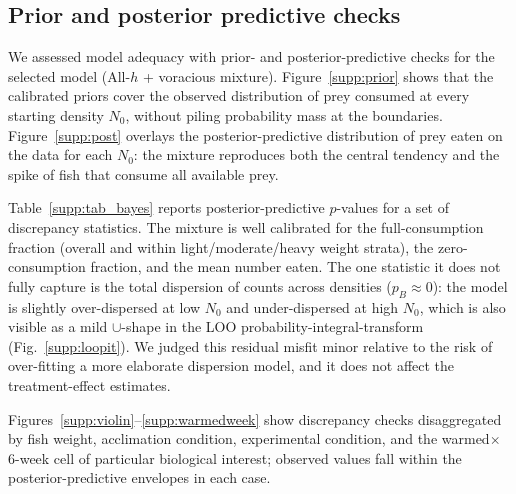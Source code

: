 
\subsection{Prior and posterior predictive checks}
\label{supp:ppc}

We assessed model adequacy with prior- and posterior-predictive checks for the
selected model (All-$h$ + voracious mixture). Figure~\ref{supp:prior} shows that
the calibrated priors cover the observed distribution of prey consumed at every
starting density $N_0$, without piling probability mass at the boundaries.
Figure~\ref{supp:post} overlays the posterior-predictive distribution of prey
eaten on the data for each $N_0$: the mixture reproduces both the central
tendency and the spike of fish that consume all available prey.

Table~\ref{supp:tab_bayes} reports posterior-predictive $p$-values for a set of
discrepancy statistics. The mixture is well calibrated for the full-consumption
fraction (overall and within light/moderate/heavy weight strata), the
zero-consumption fraction, and the mean number eaten. The one statistic it does
not fully capture is the total dispersion of counts across densities
($p_B \approx 0$): the model is slightly over-dispersed at low $N_0$ and
under-dispersed at high $N_0$, which is also visible as a mild $\cup$-shape in the
LOO probability-integral-transform (Fig.~\ref{supp:loopit}). We judged this
residual misfit minor relative to the risk of over-fitting a more elaborate
dispersion model, and it does not affect the treatment-effect estimates.

Figures~\ref{supp:violin}--\ref{supp:warmedweek} show discrepancy checks
disaggregated by fish weight, acclimation condition, experimental condition, and
the warmed$\times$6-week cell of particular biological interest; observed values
fall within the posterior-predictive envelopes in each case.

\begin{table}[h]\centering
\caption{Posterior-predictive discrepancy checks for the selected model.
$p_B$ is the two-sided posterior-predictive $p$-value.\label{supp:tab_bayes}}
\end{table}


